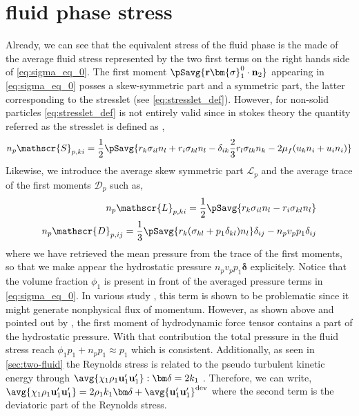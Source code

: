 \section*{fluid phase stress}
Already, we can see that the equivalent stress of the fluid phase is the made of the average fluid stress represented by the two first terms on the right hands side of \ref{eq:sigma_eq_0}. 
The first moment $\pSavg{\textbf{r}\bm{\sigma}_1^0 \cdot \textbf{n}_2}$ appearing in \ref{eq:sigma_eq_0} posses a skew-symmetric part and a symmetric part, the latter corresponding to the stresslet (see \ref{eq:stresslet_def}).
However, for non-solid particles \ref{eq:stresslet_def} is not entirely valid since in stokes theory the quantity referred as the stresslet is defined as \citet{pozrikidis1992boundary,kim2013microhydrodynamics},
\begin{equation}
    \label{eq:stresslet_def}
    n_p \mathscr{S}_{p,ki}
    = \frac{1}{2}
    \pSavg{
        r_k \sigma_{il}n_l + r_i \sigma_{kl}n_l 
        - \delta_{ik}
        \frac{2}{3}
        r_l \sigma_{lk}n_k
        - 2 \mu_f (u_k n_i+u_i n_i)
    }
\end{equation}
Likewise, we introduce the average skew symmetric part $\mathscr{L}_p$ and the average trace of the first moments $\mathscr{D}_p$ such as, 
\begin{align}
    \label{eq:torque_def}
    n_p \mathscr{L}_{p,ki}
    = \frac{1}{2}\pSavg{ r_k \sigma_{il}n_l - r_i \sigma_{kl}n_l }\\
    \label{eq:trace_def}
    n_p \mathscr{D}_{p,ij}
    = \frac{1}{3}\pSavg{ r_k (\sigma_{kl} + p_1 \delta_{kl})n_l } \delta_{ij}
    - n_p v_p p_1 \delta_{ij}
\end{align}
where we have retrieved the mean pressure from the trace of the first moments, so that we make appear the hydrostatic pressure  $n_p v_p p_1 \bm\delta$ explicitely.  
Notice that the volume fraction $\phi_1$ is present in front of the averaged pressure terms in \ref{eq:sigma_eq_0}.  
In various study \citep{prosperetti2009computational,chu2016flux}, this term is shown to be problematic  since it might generate nonphysical flux of momentum. 
However, as shown above and pointed out by  \citet{zhang1997momentum,jackson1997locally}, the first moment of hydrodynamic force tensor contains a part of the hydrostatic pressure.
With that contribution the total pressure in the fluid stress reach $\phi_1p_1 + n_p p_1 \approx p_1$ which is consistent.
Additionally, as seen in \ref{sec:two-fluid} the Reynolds stress is related to the pseudo turbulent kinetic energy through $\avg{\chi_1 \rho_1\textbf{u}_1'\textbf{u}_1'} : \bm\delta = 2k_1$ . 
Therefore, we can write, $\avg{\chi_1 \rho_1\textbf{u}_1'\textbf{u}_1'} = 2 \rho_1 k_1 \bm\delta + \avg{\textbf{u}_1'\textbf{u}_1'}^\text{dev}$ where the second term is the deviatoric part of the Reynolds stress. 

